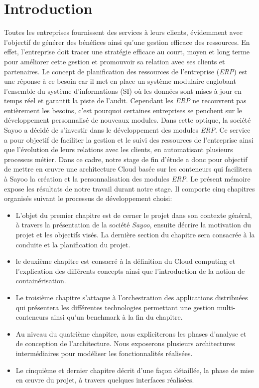 \chapter*{Introduction}

\begin{onehalfspace}
Toutes les entreprises fournissent des services à leurs clients, évidemment avec l’objectif de générer des bénéfices ainsi qu'une gestion efficace des ressources. En effet, l'entreprise doit tracer une stratégie efficace au court, moyen et long terme pour améliorer cette gestion  et promouvoir sa relation avec ses clients et partenaires. Le concept de planification des ressources de l'entreprise (\emph{ERP}) est une réponse à ce besoin  car il met en place un système modulaire englobant l'ensemble du système d'informations (SI) où les données sont mises à jour en temps réel et garantit la piste de l'audit. Cependant les \emph{ERP} ne recouvrent pas entièrement les besoins, c'est pourquoi certaines entreprises se penchent sur le développement personnalisé de nouveaux modules. 
\newline
Dans cette optique, la société Sayoo a décidé de s’investir dans le développement des modules \emph{ERP}. Ce service  a pour objectif de faciliter la gestion et le suivi des ressources de l'entreprise ainsi que l'évolution de leurs relations avec les clients, en automatisant plusieurs processus métier. Dans ce cadre, notre stage de fin d'étude a donc pour objectif de mettre en œuvre une architecture Cloud basée sur les conteneurs qui facilitera à Sayoo la création et la personnalisation des modules \emph{ERP}.
\newline
Le présent mémoire expose les résultats de notre travail durant notre stage. Il comporte cinq chapitres organisés suivant le processus de développement choisi:
\begin{itemize}
\item L’objet du premier chapitre est de cerner le projet dans son contexte général, à travers la présentation de la société \emph{Sayoo}, ensuite décrire la motivation du projet et les objectifs visés. La dernière section du chapitre sera consacrée à la conduite et la planification du projet.
\item le deuxième chapitre est consacré à la définition du Cloud computing et l'explication des différents concepts ainsi que l'introduction de la notion de containérisation. 
\item Le troisième chapitre s'attaque à l'orchestration des applications distribuées qui présentera les différentes technologies permettant une gestion multi-conteneurs ainsi qu'un benchmark à la fin du chapitre.
\item Au niveau du quatrième chapitre, nous expliciterons les phases d’analyse et de conception de l'architecture. Nous exposerons plusieurs architectures intermédiaires pour modéliser les fonctionnalités réalisées.
\item Le cinquième et dernier chapitre décrit d’une façon détaillée, la phase de mise en œuvre du projet, à travers quelques interfaces réalisées.
\end{itemize}


\end{onehalfspace}
